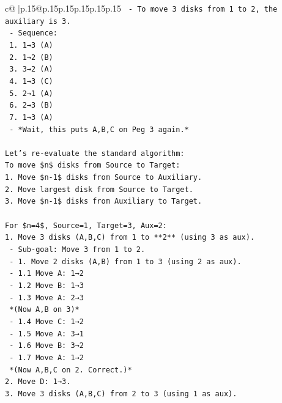 \documentclass{article}
\begin{document}
{\begin{supertabular}{c@{$\;$}|p{.15\linewidth}@{}p{.15\linewidth}p{.15\linewidth}p{.15\linewidth}p{.15\linewidth}p{.15\linewidth}}
{{{\texttt{   {-} To move 3 disks from 1 to 2, the auxiliary is 3.} \\
\texttt{   {-} Sequence:} \\
\texttt{     1. 1→3 (A)} \\
\texttt{     2. 1→2 (B)} \\
\texttt{     3. 3→2 (A)} \\
\texttt{     4. 1→3 (C)} \\
\texttt{     5. 2→1 (A)} \\
\texttt{     6. 2→3 (B)} \\
\texttt{     7. 1→3 (A)} \\
\texttt{   {-} *Wait, this puts A,B,C on Peg 3 again.*} \\
\\ 
\texttt{Let's re{-}evaluate the standard algorithm:} \\
\texttt{To move \$n\$ disks from Source to Target:} \\
\texttt{1. Move \$n{-}1\$ disks from Source to Auxiliary.} \\
\texttt{2. Move largest disk from Source to Target.} \\
\texttt{3. Move \$n{-}1\$ disks from Auxiliary to Target.} \\
\\ 
\texttt{For \$n=4\$, Source=1, Target=3, Aux=2:} \\
\texttt{1. Move 3 disks (A,B,C) from 1 to **2** (using 3 as aux).} \\
\texttt{   {-} Sub{-}goal: Move 3 from 1 to 2.} \\
\texttt{   {-} 1. Move 2 disks (A,B) from 1 to 3 (using 2 as aux).} \\
\texttt{      {-} 1.1 Move A: 1→2} \\
\texttt{      {-} 1.2 Move B: 1→3} \\
\texttt{      {-} 1.3 Move A: 2→3} \\
\texttt{      *(Now A,B on 3)*} \\
\texttt{   {-} 1.4 Move C: 1→2} \\
\texttt{   {-} 1.5 Move A: 3→1} \\
\texttt{   {-} 1.6 Move B: 3→2} \\
\texttt{   {-} 1.7 Move A: 1→2} \\
\texttt{   *(Now A,B,C on 2. Correct.)*} \\
\texttt{2. Move D: 1→3.} \\
\texttt{3. Move 3 disks (A,B,C) from 2 to 3 (using 1 as aux).} \\
}}}
\end{supertabular}}
\end{document}
